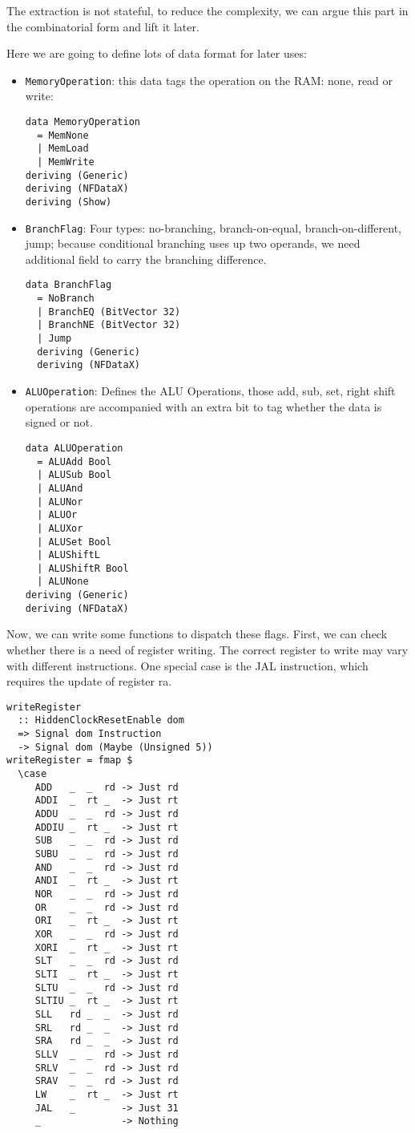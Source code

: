 The extraction is not stateful, to reduce the complexity, we can argue this part in the combinatorial form and lift it later. 

Here we are going to define lots of data format for later uses:
 
\begin{itemize}
	\item \texttt{MemoryOperation}: this data tags the operation on the RAM: none, read or write:
	\begin{verbatim}
data MemoryOperation
  = MemNone
  | MemLoad
  | MemWrite
deriving (Generic)
deriving (NFDataX)
deriving (Show)
	\end{verbatim}
	\item \texttt{BranchFlag}: Four types: no-branching, branch-on-equal, branch-on-different, jump; because conditional branching uses up two operands, we need additional field to carry the branching difference.
\begin{verbatim}
data BranchFlag
  = NoBranch
  | BranchEQ (BitVector 32)
  | BranchNE (BitVector 32)
  | Jump
  deriving (Generic)
  deriving (NFDataX)
	\end{verbatim}
  \item \texttt{ALUOperation}: Defines the ALU Operations, those add, sub, set, right shift operations are accompanied with an extra bit to tag whether the data is signed or not.
\begin{verbatim}
data ALUOperation
  = ALUAdd Bool
  | ALUSub Bool
  | ALUAnd
  | ALUNor
  | ALUOr
  | ALUXor
  | ALUSet Bool
  | ALUShiftL
  | ALUShiftR Bool
  | ALUNone
deriving (Generic)
deriving (NFDataX)
	\end{verbatim}
\end{itemize}
Now, we can write some functions to dispatch these flags. First, we can check whether there is a need of register writing. The correct register to write may vary with different instructions. One special case is the JAL instruction, which requires the update of register ra.
\begin{verbatim}
writeRegister 
  :: HiddenClockResetEnable dom
  => Signal dom Instruction
  -> Signal dom (Maybe (Unsigned 5))
writeRegister = fmap $ 
  \case
     ADD   _  _  rd -> Just rd
     ADDI  _  rt _  -> Just rt
     ADDU  _  _  rd -> Just rd
     ADDIU _  rt _  -> Just rt
     SUB   _  _  rd -> Just rd
     SUBU  _  _  rd -> Just rd
     AND   _  _  rd -> Just rd
     ANDI  _  rt _  -> Just rt
     NOR   _  _  rd -> Just rd
     OR    _  _  rd -> Just rd
     ORI   _  rt _  -> Just rt
     XOR   _  _  rd -> Just rd
     XORI  _  rt _  -> Just rt
     SLT   _  _  rd -> Just rd
     SLTI  _  rt _  -> Just rt
     SLTU  _  _  rd -> Just rd
     SLTIU _  rt _  -> Just rt
     SLL   rd _  _  -> Just rd
     SRL   rd _  _  -> Just rd
     SRA   rd _  _  -> Just rd
     SLLV  _  _  rd -> Just rd
     SRLV  _  _  rd -> Just rd
     SRAV  _  _  rd -> Just rd
     LW    _  rt _  -> Just rt
     JAL   _        -> Just 31
     _              -> Nothing
\end{verbatim}
